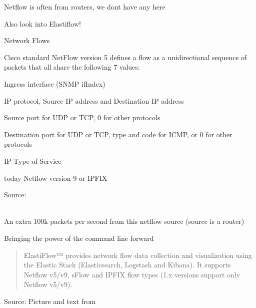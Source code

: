 \documentclass[Screen16to9,17pt]{foils}
\begin{document}
\centerline{Netflow is often from routers, we dont have any here}

Also look into Elastiflow! 



\begin{list1}
\item Network Flows
\item Cisco standard NetFlow version 5 defines a flow as a unidirectional sequence of packets that all share the following 7 values:
\begin{list2}
\item Ingress interface (SNMP ifIndex)
\item IP protocol, Source IP address and Destination IP address
\item Source port for UDP or TCP, 0 for other protocols
\item Destination port for UDP or TCP, type and code for ICMP, or 0 for other protocols
\item IP Type of Service
\end{list2}
\item today Netflow version 9 or IPFIX
\end{list1}

Source: \\{\footnotesize
{}\\
}








\centerline{An extra 100k packets per second from this netflow source (source is a router)}



\centerline{Bringing the power of the command line forward}



\begin{quote}
  ElastiFlow™ provides network flow data collection and visualization using the Elastic Stack (Elasticsearch, Logstash and Kibana). It supports Netflow v5/v9, sFlow and IPFIX flow types (1.x versions support only Netflow v5/v9).
\end{quote}
Source: Picture and text from  \\
\end{document}
